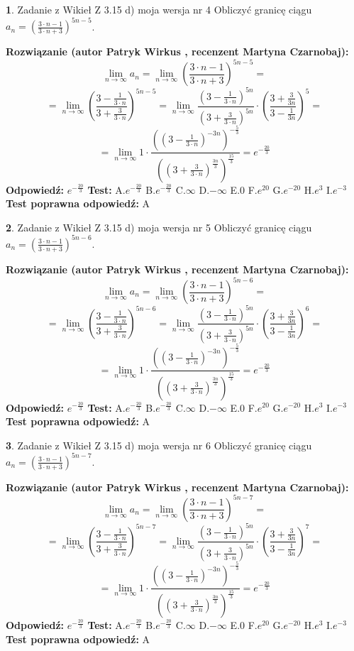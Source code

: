 \documentclass[12pt, a4paper]{article}
\theoremstyle{definition} %
\newtheorem{zad}{}
\newcommand{\zadStart}[1]{\begin{zad}#1\newline}
\newcommand{\zadStop}{\end{zad}}
\newcommand{\rozwStart}[2]{\noindent \textbf{Rozwiązanie (autor #1 , recenzent #2): }\newline}
\newcommand{\rozwStop}{\newline}
\newcommand{\odpStart}{\noindent \textbf{Odpowiedź:}\newline}
\newcommand{\odpStop}{\newline}
\newcommand{\testStart}{\noindent \textbf{Test:}\newline}
\newcommand{\testStop}{\newline}
\newcommand{\kluczStart}{\noindent \textbf{Test poprawna odpowiedź:}\newline}
\newcommand{\kluczStop}{\newline}
\begin{document}
\zadStart{Zadanie z Wikieł Z 3.15 d) moja wersja nr 4}
Obliczyć granicę ciągu $a_{n}=(\frac{3\cdot n - 1}{3 \cdot n + 3})^{5n-5}$.
\zadStop
\rozwStart{Patryk Wirkus}{Martyna Czarnobaj}
$$\lim\limits_{n\to\infty} a_{n} = \lim\limits_{n\to\infty}(\frac{3\cdot n - 1}{3 \cdot n + 3})^{5n-5}=$$
$$=\lim\limits_{n\to\infty}(\frac{3 - \frac{1}{3\cdot n}}{3 + \frac{3}{3 \cdot n}})^{5n-5}=\lim\limits_{n\to\infty}\frac{(3 - \frac{1}{3\cdot n})^{5n}}{(3 + \frac{3}{3\cdot n})^{5n}} \cdot (\frac{3+\frac{3}{3n}}{3-\frac{1}{3n}})^{5}=$$
$$=\lim\limits_{n\to\infty} 1 \cdot \frac{((3-\frac{1}{3 \cdot n})^{-3n})^{-\frac{5}{3}}}{((3+\frac{3}{3 \cdot n})^{\frac{3n}{3}})^{\frac{15}{3}}} =e^{-\frac{20}{3}}$$
\rozwStop
\odpStart
$e^{-\frac{20}{3}}$
\odpStop
\testStart
A.$ e^{-\frac{20}{3}}$
B.$ e^{-\frac{20}{3}}$
C.$\infty$
D.$-\infty$
E.$0$
F.$e^{20}$
G.$e^{-20}$
H.$e^{3}$
I.$e^{-3}$
\testStop
\kluczStart
A
\kluczStop



\zadStart{Zadanie z Wikieł Z 3.15 d) moja wersja nr 5}
Obliczyć granicę ciągu $a_{n}=(\frac{3\cdot n - 1}{3 \cdot n + 3})^{5n-6}$.
\zadStop
\rozwStart{Patryk Wirkus}{Martyna Czarnobaj}
$$\lim\limits_{n\to\infty} a_{n} = \lim\limits_{n\to\infty}(\frac{3\cdot n - 1}{3 \cdot n + 3})^{5n-6}=$$
$$=\lim\limits_{n\to\infty}(\frac{3 - \frac{1}{3\cdot n}}{3 + \frac{3}{3 \cdot n}})^{5n-6}=\lim\limits_{n\to\infty}\frac{(3 - \frac{1}{3\cdot n})^{5n}}{(3 + \frac{3}{3\cdot n})^{5n}} \cdot (\frac{3+\frac{3}{3n}}{3-\frac{1}{3n}})^{6}=$$
$$=\lim\limits_{n\to\infty} 1 \cdot \frac{((3-\frac{1}{3 \cdot n})^{-3n})^{-\frac{5}{3}}}{((3+\frac{3}{3 \cdot n})^{\frac{3n}{3}})^{\frac{15}{3}}} =e^{-\frac{20}{3}}$$
\rozwStop
\odpStart
$e^{-\frac{20}{3}}$
\odpStop
\testStart
A.$ e^{-\frac{20}{3}}$
B.$ e^{-\frac{20}{3}}$
C.$\infty$
D.$-\infty$
E.$0$
F.$e^{20}$
G.$e^{-20}$
H.$e^{3}$
I.$e^{-3}$
\testStop
\kluczStart
A
\kluczStop



\zadStart{Zadanie z Wikieł Z 3.15 d) moja wersja nr 6}
Obliczyć granicę ciągu $a_{n}=(\frac{3\cdot n - 1}{3 \cdot n + 3})^{5n-7}$.
\zadStop
\rozwStart{Patryk Wirkus}{Martyna Czarnobaj}
$$\lim\limits_{n\to\infty} a_{n} = \lim\limits_{n\to\infty}(\frac{3\cdot n - 1}{3 \cdot n + 3})^{5n-7}=$$
$$=\lim\limits_{n\to\infty}(\frac{3 - \frac{1}{3\cdot n}}{3 + \frac{3}{3 \cdot n}})^{5n-7}=\lim\limits_{n\to\infty}\frac{(3 - \frac{1}{3\cdot n})^{5n}}{(3 + \frac{3}{3\cdot n})^{5n}} \cdot (\frac{3+\frac{3}{3n}}{3-\frac{1}{3n}})^{7}=$$
$$=\lim\limits_{n\to\infty} 1 \cdot \frac{((3-\frac{1}{3 \cdot n})^{-3n})^{-\frac{5}{3}}}{((3+\frac{3}{3 \cdot n})^{\frac{3n}{3}})^{\frac{15}{3}}} =e^{-\frac{20}{3}}$$
\rozwStop
\odpStart
$e^{-\frac{20}{3}}$
\odpStop
\testStart
A.$ e^{-\frac{20}{3}}$
B.$ e^{-\frac{20}{3}}$
C.$\infty$
D.$-\infty$
E.$0$
F.$e^{20}$
G.$e^{-20}$
H.$e^{3}$
I.$e^{-3}$
\testStop
\kluczStart
A
\kluczStop
\end{document}
